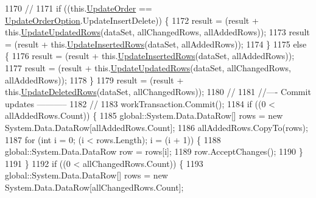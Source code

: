 \begin{DoxyCode}
1170                 \textcolor{comment}{//}
1171                 \textcolor{keywordflow}{if} ((this.\hyperlink{class_proyecto___integrador__3_1_1ds_unidad_table_adapters_1_1_table_adapter_manager_a002d41398871750c340bb6bf45a14e16}{UpdateOrder} == \hyperlink{class_proyecto___integrador__3_1_1ds_unidad_table_adapters_1_1_table_adapter_manager_abc7bc304d216e1258eb95cc9c8b98997}{UpdateOrderOption}.UpdateInsertDelete))
       \{
1172                     result = (result + this.\hyperlink{class_proyecto___integrador__3_1_1ds_unidad_table_adapters_1_1_table_adapter_manager_a1762fa6691cf10d2bd733b9b28d6cb78}{UpdateUpdatedRows}(dataSet, allChangedRows, 
      allAddedRows));
1173                     result = (result + this.\hyperlink{class_proyecto___integrador__3_1_1ds_unidad_table_adapters_1_1_table_adapter_manager_aa6daba3bfb296d904aef4be4e00b651d}{UpdateInsertedRows}(dataSet, allAddedRows));
1174                 \}
1175                 \textcolor{keywordflow}{else} \{
1176                     result = (result + this.\hyperlink{class_proyecto___integrador__3_1_1ds_unidad_table_adapters_1_1_table_adapter_manager_aa6daba3bfb296d904aef4be4e00b651d}{UpdateInsertedRows}(dataSet, allAddedRows));
1177                     result = (result + this.\hyperlink{class_proyecto___integrador__3_1_1ds_unidad_table_adapters_1_1_table_adapter_manager_a1762fa6691cf10d2bd733b9b28d6cb78}{UpdateUpdatedRows}(dataSet, allChangedRows, 
      allAddedRows));
1178                 \}
1179                 result = (result + this.\hyperlink{class_proyecto___integrador__3_1_1ds_unidad_table_adapters_1_1_table_adapter_manager_a3cbe0d89e42e22b2c236f8c3dc69432f}{UpdateDeletedRows}(dataSet, allChangedRows));
1180                 \textcolor{comment}{// }
1181                 \textcolor{comment}{//---- Commit updates -----------}
1182                 \textcolor{comment}{//}
1183                 workTransaction.Commit();
1184                 \textcolor{keywordflow}{if} ((0 < allAddedRows.Count)) \{
1185                     global::System.Data.DataRow[] rows = \textcolor{keyword}{new} System.Data.DataRow[allAddedRows.Count];
1186                     allAddedRows.CopyTo(rows);
1187                     \textcolor{keywordflow}{for} (\textcolor{keywordtype}{int} i = 0; (i < rows.Length); i = (i + 1)) \{
1188                         global::System.Data.DataRow row = rows[i];
1189                         row.AcceptChanges();
1190                     \}
1191                 \}
1192                 \textcolor{keywordflow}{if} ((0 < allChangedRows.Count)) \{
1193                     global::System.Data.DataRow[] rows = \textcolor{keyword}{new} System.Data.DataRow[allChangedRows.Count];

\end{DoxyCode}
